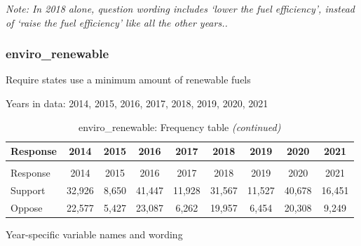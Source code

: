 \documentclass[
  12pt]{article}
\begin{document}
\emph{Note: In 2018 alone, question wording includes `lower the fuel
efficiency', instead of `raise the fuel efficiency' like all the other
years..}

\hypertarget{enviro_renewable}{%
\subsubsection{enviro\_renewable}\label{enviro_renewable}}

Require states use a minimum amount of renewable fuels

Years in data: 2014, 2015, 2016, 2017, 2018, 2019, 2020,
2021\begingroup\fontsize{10}{12}\selectfont

\begin{longtable}[t]{lcccccccc}
\caption{\label{tab:unnamed-chunk-5}enviro\_renewable: Frequency table}\\
\toprule
Response & 2014 & 2015 & 2016 & 2017 & 2018 & 2019 & 2020 & 2021\\
\midrule
\endfirsthead
\caption[]{enviro\_renewable: Frequency table \textit{(continued)}}\\
\toprule
Response & 2014 & 2015 & 2016 & 2017 & 2018 & 2019 & 2020 & 2021\\
\midrule
\endhead

\endfoot
\bottomrule
\endlastfoot
Support & 32,926 & 8,650 & 41,447 & 11,928 & 31,567 & 11,527 & 40,678 & 16,451\\
Oppose & 22,577 & 5,427 & 23,087 & 6,262 & 19,957 & 6,454 & 20,308 & 9,249\\*
\end{longtable}
\endgroup{}

Year-specific variable names and
wording\begingroup\fontsize{11}{13}\selectfont
\end{document}
